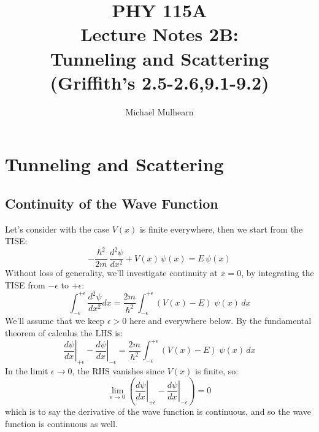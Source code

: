 \documentclass[12pt]{book}
\begin{document}
\newcommand{\ihbar}{\ensuremath{i \hbar}}
\newcommand{\Pss}{\ensuremath{\Psi^*}}
\newcommand{\dPsidt}{\ensuremath{ \frac{\partial \Psi}{\partial t} }}
\newcommand{\dPsidx}{\ensuremath{ \frac{\partial \Psi}{\partial x} }}
\newcommand{\ddPsidx}{\ensuremath{ \frac{\partial^2 \Psi}{\partial x^2} }}
\newcommand{\dPssdt}{\ensuremath{ \frac{\partial \Psi^*}{\partial t} }}
\newcommand{\dPssdx}{\ensuremath{ \frac{\partial \Psi^*}{\partial x} }}
\newcommand{\ddPssdx}{\ensuremath{ \frac{\partial^2 \Psi^*}{\partial x^2} }}

\newcommand{\dphidt}{\ensuremath{ \frac{d \phi}{dt} }}
\newcommand{\dpsidx}{\ensuremath{ \frac{d \psi}{dx} }}
\newcommand{\ddpsidx}{\ensuremath{ \frac{d^2 \psi}{dx^2} }}


\title{PHY 115A \\ Lecture Notes 2B: \\ 
Tunneling and Scattering \\
(Griffith's 2.5-2.6,9.1-9.2)}
\author{Michael Mulhearn}

\maketitle

\setcounter{chapter}{1}
\chapter{Tunneling and Scattering}
\setcounter{section}{25}
\setcounter{equation}{70}

\section{Continuity of the Wave Function}

Let's consider with the case $V(x)$ is finite everywhere, then we start from the TISE:
$$-\frac{\hbar^2}{2m}\,\frac{d^2 \psi}{d x^2} + V(x) \, \psi(x) = E \, \psi(x)$$
Without loss of generality, we'll investigate continuity at $x=0$, by integrating the TISE from $-\epsilon$ to $+\epsilon$:
$$\int_{-\epsilon}^{+\epsilon}\frac{d^2 \psi}{d x^2} dx = \frac{2m}{\hbar^2}\int_{-\epsilon}^{+\epsilon} \left(V(x) - E\right) \; \psi(x) \, dx$$
We'll assume that we keep $\epsilon > 0$ here and everywhere below.  By the fundamental theorem of calculus the LHS is:
\begin{equation}
\label{eqn:psicont}
\left. \frac{d\psi}{d x} \right\rvert_{+\epsilon} 
- \left. \frac{d\psi}{d x} \right\rvert_{-\epsilon}
 = \frac{2m}{\hbar^2}\int_{-\epsilon}^{+\epsilon} \left(V(x) - E\right) \; \psi(x) \, dx
\end{equation}
In the limit $\epsilon \to 0$, the RHS vanishes since $V(x)$ is finite, so:
$$ \lim_{\epsilon \to 0} \left( \left. \frac{d\psi}{d x} \right\rvert_{+\epsilon} 
- \left. \frac{d\psi}{d x} \right\rvert_{-\epsilon} \right) = 0$$
which is to say the derivative of the wave function is continuous, and so the wave function is continuous as well.
\end{document}
